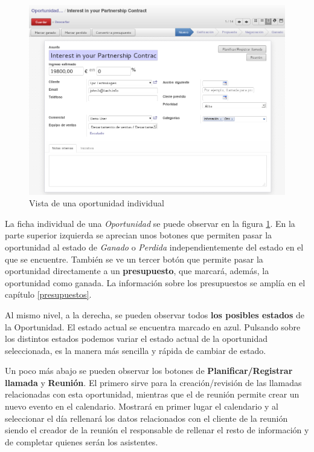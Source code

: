 \begin{figure}[H]
\includegraphics[width=\textwidth]{ventas/img/ven_opoindividual.png}
\caption{Vista de una oportunidad individual}
\label{ven:opoindividual}
\end{figure}

La ficha individual de una \emph{Oportunidad} se puede observar en la figura \ref{ven:opoindividual}. En la parte superior izquierda se 
aprecian unos botones que permiten pasar la oportunidad al estado de \emph{Ganado} o \emph{Perdida} independientemente del estado en el que se encuentre. También se ve un tercer botón que permite pasar la oportunidad directamente a un \textbf{presupuesto}, que marcará, además, la oportunidad como ganada. La información sobre los presupuestos se amplía en el capítulo \ref{presupuestos}.

Al mismo nivel, a la derecha, se pueden observar todos \textbf{los posibles estados} de la Oportunidad. El estado actual se encuentra
marcado en azul. Pulsando sobre los distintos estados podemos variar el estado actual de la oportunidad seleccionada, es la manera 
más sencilla y rápida de cambiar de estado.

Un poco más abajo se pueden observar los botones de \textbf{Planificar/Registrar llamada} y \textbf{Reunión}. El primero sirve para la creación/revisión de las llamadas relacionadas con esta oportunidad, mientras que el de reunión permite crear un nuevo evento en el calendario. Mostrará en primer lugar el calendario y al seleccionar el día rellenará los datos relacionados con el cliente de la reunión
siendo el creador de la reunión el responsable de rellenar el resto de información y de completar quienes serán los asistentes.

